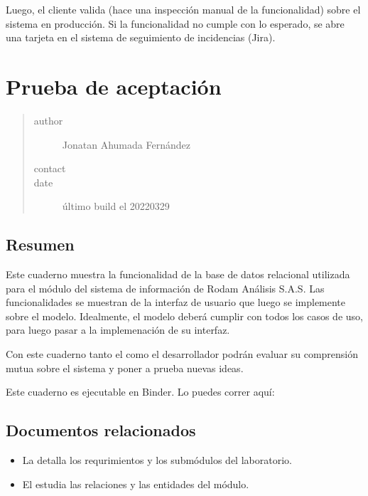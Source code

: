 \documentclass[letterpaper,10pt,spanish]{sphinxmanual}
\begin{document}
Luego, el cliente valida (hace una inspección manual de la
funcionalidad) sobre el sistema en producción. Si la funcionalidad no
cumple con lo esperado, se abre una tarjeta en el sistema de
seguimiento de incidencias (Jira).


\chapter{Prueba de aceptación}
\label{\detokenize{requerimientos/laboratorio_aceptacion:prueba-de-aceptacion}}\label{\detokenize{requerimientos/laboratorio_aceptacion::doc}}\begin{quote}\begin{description}
\item[{author}] \leavevmode
Jonatan Ahumada Fernández

\item[{contact}] \leavevmode
{}

\item[{date}] \leavevmode
último build el 2022\sphinxhyphen{}03\sphinxhyphen{}29

\end{description}\end{quote}


\section{Resumen}
\label{\detokenize{requerimientos/laboratorio_aceptacion:resumen}}
Este cuaderno muestra la funcionalidad de la base de datos relacional
utilizada para el módulo  del sistema de información de
Rodam Análisis S.A.S. Las funcionalidades se muestran
 de la interfaz de usuario que luego se implemente
sobre el modelo. Idealmente, el modelo deberá cumplir con todos los
casos de uso, para luego pasar a la implemenación de su interfaz.

Con este cuaderno tanto el  como el desarrollador podrán
evaluar su comprensión mutua sobre el sistema y poner a prueba nuevas
ideas.

Este cuaderno es ejecutable en Binder. Lo puedes correr aquí:



\section{Documentos relacionados}
\label{\detokenize{requerimientos/laboratorio_aceptacion:documentos-relacionados}}\begin{itemize}
\item {} 
La  detalla los requrimientos y los
submódulos del laboratorio.

\item {} 
El  estudia las relaciones y las entidades del
módulo.

\end{itemize}
\end{document}
